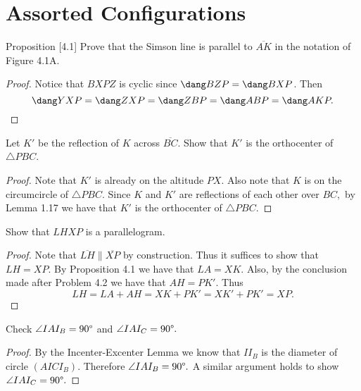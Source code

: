 \documentclass[letterpaper,oneside]{scrartcl}
\providecommand{\ol}{\overline}
\begin{document}
\section{Assorted Configurations}
\begin{proposition*}
  Proposition [4.1]
  Prove that the Simson line is parallel to $\ol{AK}$ in the notation of Figure 4.1A.
\end{proposition*}
\begin{proof}
  Notice that $BXPZ$ is cyclic since $\dang BZP = \dang BXP$. Then
  $$\dang YXP = \dang ZXP = \dang ZBP  = \dang ABP = \dang AKP.$$
\end{proof}
\begin{problem*}
  [4.2]
  Let $K'$ be the reflection of $K$ across $\ol{BC}$. Show that $K'$ is the orthocenter of $\triangle PBC$. 
\end{problem*}
\begin{proof}
  Note that $K'$ is already on the altitude $PX.$ Also note that $K$ is on the circumcircle of $\triangle PBC.$ Since $K$ and $K'$ are reflections of each other over $BC,$ by Lemma 1.17 we have that $K'$ is the orthocenter of $\triangle PBC.$
\end{proof}
\begin{problem*}
  [4.3]
  Show that $LHXP$ is a parallelogram.
\end{problem*}
\begin{proof}
  Note that $\ol{LH} \parallel \ol{XP}$ by construction. Thus it suffices to show that $LH = XP.$ By Proposition 4.1 we have that $LA = XK.$ Also, by the conclusion made after Problem 4.2 we have that $AH = PK'.$ Thus
  $$LH = LA + AH = XK + PK' = XK' + PK' = XP.$$
\end{proof}

\begin{problem*}
  [4.5]
  Check $\angle IAI_B = 90\degree$ and $\angle IAI_C = 90\degree.$
\end{problem*}
\begin{proof}
  By the Incenter-Excenter Lemma we know that $II_B$ is the diameter of circle $(AICI_B)$. Therefore $\angle IAI_B = 90\degree.$ A similar argument holds to show $\angle IAI_C = 90\degree.$
\end{proof}
\end{document}
